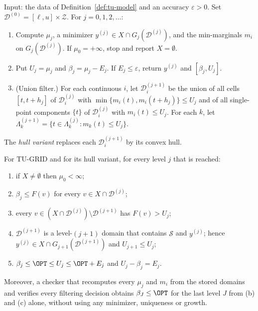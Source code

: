 \begin{algorithm}\label{alg:tugrid}
Input: the data of Definition~\ref{def:tu-model} and an accuracy
$\varepsilon>0$. Set $\mathcal D^{(0)}=[\ell,u]\times\mathcal Z$. For
$j=0,1,2,\dots$:
\begin{enumerate}[label=(\arabic*)]
\item Compute $\mu_j$, a minimizer $y^{(j)}\in X\cap G_j(\mathcal D^{(j)})$, and
the min-marginals $m_i$ on $G_j(\mathcal D^{(j)})$. If $\mu_0=+\infty$, stop and
report $X=\emptyset$.
\item Put $U_j=\mu_j$ and $\beta_j=\mu_j-E_j$. If $E_j\le\varepsilon$, return
$y^{(j)}$ and $[\beta_j,U_j]$.
\item (Union filter.) For each continuous $i$, let $\mathcal D^{(j+1)}_i$ be
the union of all cells $[t,t+h_j]$ of $\mathcal D^{(j)}_i$ with
$\min\{m_i(t),m_i(t+h_j)\}\le U_j$ and of all single-point components
$\{t\}$ of $\mathcal D^{(j)}_i$ with $m_i(t)\le U_j$. For each $k$, let
$\Lambda^{(j+1)}_k=\{t\in\Lambda^{(j)}_k:m_{k}(t)\le U_j\}$.
\end{enumerate}
The \emph{hull variant} replaces each $\mathcal D^{(j+1)}_i$ by its convex hull.
\end{algorithm}

\begin{proposition}[Soundness]\label{prop:tu-sound}
For TU-GRID and for its hull variant, for every level $j$ that is reached:
\begin{enumerate}[label=(\alph*)]
\item if $X\ne\emptyset$ then $\mu_0<\infty$;
\item $\beta_j\le F(v)$ for every $v\in X\cap\mathcal D^{(j)}$;
\item every $v\in(X\cap\mathcal D^{(j)})\setminus\mathcal D^{(j+1)}$ has
$F(v)>U_j$;
\item $\mathcal D^{(j+1)}$ is a level-$(j+1)$ domain that contains $\mathcal S$
and $y^{(j)}$; hence $y^{(j)}\in X\cap G_{j+1}(\mathcal D^{(j+1)})$ and
$U_{j+1}\le U_j$;
\item $\beta_j\le\OPT\le U_j\le\OPT+E_j$ and $U_j-\beta_j=E_j$.
\end{enumerate}
Moreover, a checker that recomputes every $\mu_j$ and $m_i$ from the stored
domains and verifies every filtering decision obtains $\beta_J\le\OPT$ for
the last level $J$ from (b) and (c) alone, without using any minimizer,
uniqueness or growth.
\end{proposition}

